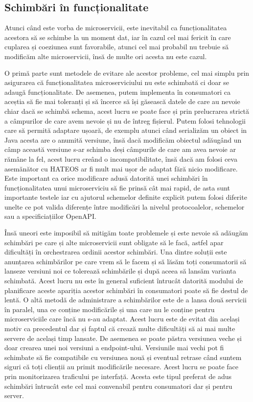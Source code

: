 \subsection{Schimbări în funcționalitate}

Atunci când este vorba de microservicii, este inevitabil ca funcționalitatea acestora să
se schimbe la un moment dat, iar în cazul cel mai fericit în care cuplarea și coeziunea sunt favorabile,
atunci cel mai probabil nu trebuie să modificăm alte microservicii, însă de multe ori acesta nu este
cazul.

O primă parte sunt metodele de evitare ale acestor probleme, cel mai simplu prin asigurarea
că funcționalitatea microserviciului nu este schimbată ci doar se adaugă funcționalitate. De asemenea,
putem implementa în consumatori ca aceștia să fie mai toleranți și să încerce să își găsească 
datele de care au nevoie chiar dacă se schimbă schema, acest lucru se poate face și prin prelucrarea
strictă a câmpurilor de care avem nevoie și nu de întreg fișierul. Putem folosi tehnologii care să
permită adaptare ușoară, de exemplu atunci când serializăm un obiect in Java acesta are o anumită
versiune, însă dacă modificăm obiectul adăugând un câmp această versiune s-ar schimba deși 
câmpurile de care am avea nevoie ar rămâne la fel, acest lucru creând o incompatibilitate, însă
dacă am folosi ceva asemănător cu HATEOS ar fi mult mai ușor de adaptat fără nicio modificare.
Este important ca orice modificare adusă datorită unei schimbări în funcționalitatea unui microserviciu
să fie prinsă cât mai rapid, de asta sunt importante testele iar cu ajutorul schemelor definite 
explicit putem folosi diferite unelte ce pot valida diferențe între modificări la nivelul 
protocoalelor, schemelor sau a specificiațiilor OpenAPI.

Însă uneori este imposibil să mitigăm toate problemele și este nevoie să adăugăm schimbări pe care
și alte microservicii sunt obligate să le facă, astfel apar dificultăți în orchestrarea ordinii acestor schimbări.
Una dintre soluții este anunțarea schimbărilor pe care vrem să le facem și să lăsăm toți consumatorii 
să lanseze versiuni noi ce tolerează schimbările și după aceea să lansăm varianta schimbată.
Acest lucru nu este în general suficient întrucât datorită modului de planificare aceste 
apariția acestor schimbări în consumatori poate să fie destul de lentă. O altă metodă 
de administrare a schimbărilor este de a lansa două servicii în paralel, una ce conține 
modificările și una care nu le conține pentru microserviciile care încă nu s-au adaptat.
Acest lucru este de evitat din același motiv ca precedentul dar și faptul că crează multe 
dificultăți să ai mai multe servere de același timp lansate. De asemenea se poate păstra
versiunea veche și doar crearea unei noi versiuni a endpoint-ului. Versiunile mai vechi
pot fi schimbate să fie compatibile cu versiunea nouă și eventual retrase când suntem siguri că
toți clienții au primit modificările necesare. Acest lucru se poate face prin monitorizarea traficului
pe interfață. Acesta este tipul preferat de adus schimbări întrucât este cel mai convenabil pentru
consumatori dar și pentru server.
